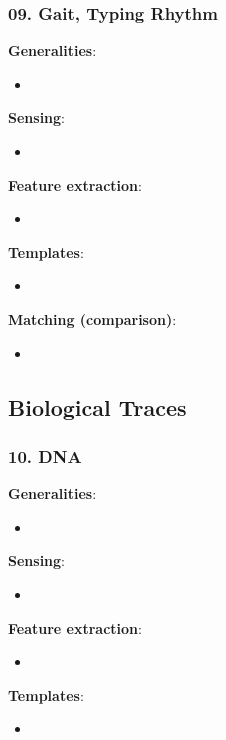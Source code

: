 \documentclass[a4paper]{article}
\begin{document}
    \subsubsection*{09. Gait, Typing Rhythm}
      \textbf{Generalities}:
      \begin{itemize}
        \item 
      \end{itemize}

      \textbf{Sensing}:
      \begin{itemize}
        \item 
      \end{itemize}

      \textbf{Feature extraction}:
      \begin{itemize}
        \item 
      \end{itemize}

      \textbf{Templates}:
      \begin{itemize}
        \item 
      \end{itemize}

      \textbf{Matching (comparison)}:
      \begin{itemize}
        \item 
      \end{itemize}
  \subsection*{Biological Traces}
    \subsubsection*{10. DNA}
      \textbf{Generalities}:
      \begin{itemize}
        \item 
      \end{itemize}

      \textbf{Sensing}:
      \begin{itemize}
        \item 
      \end{itemize}

      \textbf{Feature extraction}:
      \begin{itemize}
        \item 
      \end{itemize}

      \textbf{Templates}:
      \begin{itemize}
        \item 
      \end{itemize}
\end{document}

